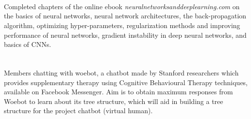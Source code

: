 \documentclass{report}
\begin{document}
     \hspace{-4.8cm}
     \setlength{\headsep}{0pt}
     \setlength{\voffset}{-1.5inch}
     \setlength{\headheight}{0pt}
     \setlength{\topmargin}{0pt}
     \\[+2cm]
     
     \setlength{\baselineskip}{+8mm}
     
     \\[-9mm]
     \paragraph{}{\fontsize{15}{18}\selectfont Completed chapters of the online ebook \textit{neuralnetworksanddeeplearning.com} on the basics of neural networks, neural network architectures, the back-propagation algorithm, optimizing hyper-parameters, regularization methods and improving performance of neural networks, gradient instability in deep neural networks, and basics of CNNs.}\\[+7mm]
     
     \\[-9mm]
     \paragraph{}{\fontsize{15}{18}\selectfont Members chatting with woebot, a chatbot made by Stanford researchers which provides supplementary therapy using Cognitive Behavioural Therapy techniques, available on Facebook Messenger. Aim is to obtain maximum responses from Woebot to learn about its tree structure, which will aid in building a tree structure for the project chatbot (virtual human).}
     
     
     \newpage
     
\end{document}
